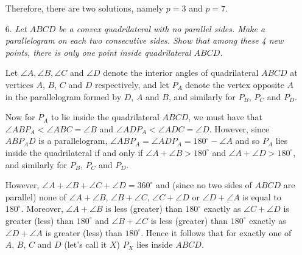 \documentclass[a4paper,12pt]{article}
\begin{document}
\begin{enumerate}
  Therefore, there are two solutions, namely $p=3$ and $p=7$.
  
  
  \item[6.] \emph{Let $ABCD$ be a convex quadrilateral with no parallel sides. Make a parallelogram on each two consecutive sides. Show that among these 4 new points, there is only one point inside quadrilateral $ABCD$.}
  
  Let $\angle A, \angle B, \angle C$ and $\angle D$ denote the interior angles of quadrilateral $ABCD$ at vertices $A$, $B$, $C$ and $D$ respectively, and let $P_A$ denote the vertex opposite $A$ in the parallelogram formed by $D$, $A$ and $B$, and similarly for $P_B$, $P_C$ and $P_D$.
  
  Now for $P_A$ to lie inside the quadrilateral $ABCD$, we must have that $\angle ABP_A < \angle ABC = \angle B$ and $\angle ADP_A < \angle ADC = \angle D$. However, since $ABP_AD$ is a parallelogram, $\angle ABP_A = \angle ADP_A = 180^\circ - \angle A$ and so $P_A$ lies inside the quadrilateral if and only if $\angle A + \angle B > 180^\circ$ and $\angle A + \angle D > 180^\circ$, and similarly for $P_B$, $P_C$ and $P_D$.
  
  However, $\angle A + \angle B + \angle C + \angle D = 360^\circ$ and (since no two sides of $ABCD$ are parallel) none of $\angle A + \angle B$, $\angle B + \angle C$, $\angle C + \angle D$ or $\angle D + \angle A$ is equal to $180^\circ$. Moreover, $\angle A + \angle B$ is less (greater) than $180^\circ$ exactly as $\angle C + \angle D$ is greater (less) than $180^\circ$ and $\angle B + \angle C$ is less (greater) than $180^\circ$ exactly as $\angle D + \angle A$ is greater (less) than $180^\circ$. Hence it follows that for exactly one of $A$, $B$, $C$ and $D$ (let's call it $X$) $P_X$ lies inside $ABCD$.
  
  
\end{enumerate}


\centering
\begin{BVerbatim}
\end{BVerbatim}
\end{document}
